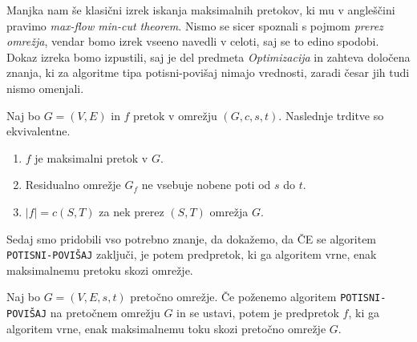 \documentclass[mat1]{fmfdelo}
\begin{document}
Manjka nam še klasični izrek iskanja maksimalnih pretokov, ki mu v angleščini pravimo \textit{max-flow min-cut theorem}. Nismo se sicer spoznali s pojmom \textit{prerez omrežja}, vendar bomo izrek vseeno navedli v celoti, saj se to edino spodobi. Dokaz izreka bomo izpustili, saj je del predmeta \textit{Optimizacija} in zahteva
določena znanja, ki za algoritme tipa potisni-povišaj nimajo vrednosti, zaradi česar jih tudi nismo omenjali.

\begin{izrek} \label{izr:maxflowmincut}
  Naj bo $G = (V,E)$ in $f$ pretok v omrežju $(G, c, s, t)$. Naslednje trditve so ekvivalentne.
  \begin{enumerate}
    \item $f$ je maksimalni pretok v $G$.
    \item Residualno omrežje $G_f$ ne vsebuje nobene poti od $s$ do $t$.
    \item $|f| = c(S, T)$ za nek prerez $(S,T)$ omrežja $G$.
  \end{enumerate}
\end{izrek}

Sedaj smo pridobili vso potrebno znanje, da dokažemo, da ČE se algoritem \texttt{POTISNI-POVIŠAJ} zaključi, je potem predpretok, ki ga algoritem vrne, enak maksimalnemu pretoku skozi omrežje.

\begin{izrek}
Naj bo $G=(V,E,s,t)$ pretočno omrežje. Če poženemo algoritem \texttt{POTISNI-POVIŠAJ} na pretočnem omrežju $G$ in se ustavi, potem je predpretok $f$, ki ga algoritem vrne, enak maksimalnemu toku skozi pretočno omrežje $G$.
\end{izrek}
\end{document}

